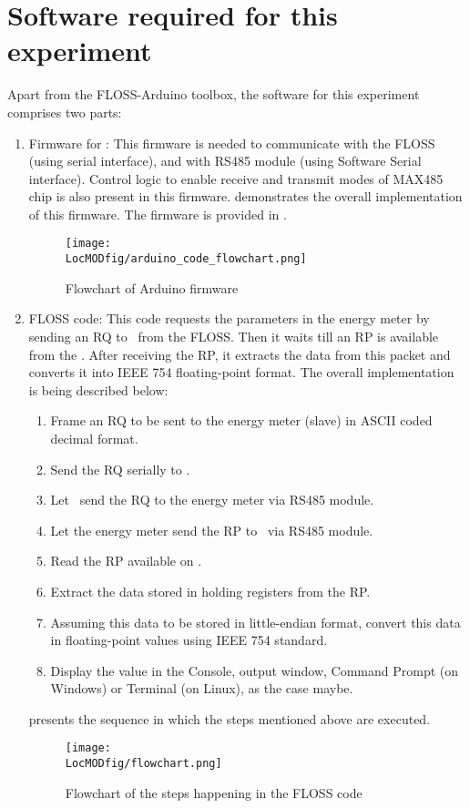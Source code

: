 \section{Software required for this experiment}
Apart from the FLOSS-Arduino toolbox, the software for this experiment comprises two parts:
\begin{enumerate}
\item  Firmware for \arduino: This firmware is needed to communicate
with the FLOSS (using serial interface), and with RS485 module (using
Software Serial interface). Control logic to enable receive and
transmit modes of MAX485 chip is also present in this firmware.  demonstrates the overall implementation of this firmware. The firmware is provided in .

\begin{figure}
  \centering
  \texttt{[image: \\LocMODfig/arduino\_code\_flowchart.png]}
  \caption{Flowchart of Arduino firmware}
  \label{fig:modbus-firmware}
\end{figure}

\item FLOSS code: This code requests the parameters in the energy meter
by sending an RQ to \arduino\ from the FLOSS. Then it waits till
an RP is available from the \arduino. After receiving the RP, it extracts
the data from this packet and converts it into IEEE
754 floating-point format. The overall implementation is being
described below:
\begin {enumerate}
  \item Frame an RQ to be sent to the energy meter (slave) in ASCII coded decimal
  format.
  \item Send the RQ serially to \arduino.
  \item Let \arduino\ send the RQ to the energy meter via RS485 module.
  \item Let the energy meter send the RP to \arduino\ via RS485 module.
  \item Read the RP available on \arduino.
  \item Extract the data stored in holding registers from the RP.
  \item Assuming this data to be stored in little-endian format,
  convert this data in floating-point values using IEEE 754 standard.
  \item Display the value in the Console, output window, Command Prompt (on Windows) or Terminal (on Linux), as the case maybe.
\end{enumerate}
 presents the sequence in which the steps mentioned above are executed.
\begin{figure}
  \centering
  \texttt{[image: \\LocMODfig/flowchart.png]}
  \caption{Flowchart of the steps happening in the FLOSS code}
  \label{fig:flow-chart}
\end{figure}

\end{enumerate}

